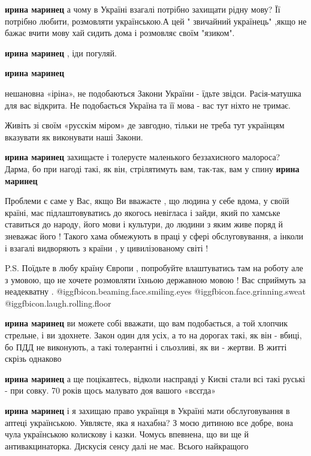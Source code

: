 \begin{itemize}
\begin{itemize}
\textbf{ирина маринец} а чому в Україні взагалі потрібно захищати рідну мову? Її потрібно любити, розмовляти українською.А цей " звичайний українець" ,якщо не бажає вчити мову хай сидить дома і розмовляє своїм "язиком".

\textbf{ирина маринец} , іди погуляй.

\textbf{ирина маринец} 

нешановна «іріна», не подобаються Закони України - їдьте звідси. Расія-матушка
для вас відкрита.  Не подобається Україна та її мова - вас тут ніхто не тримає.

Живіть зі своїм «русскім міром» де завгодно, тільки не треба тут українцям
вказувати як виконувати наші Закони.

\textbf{ирина маринец} захищаєте і толеруєте маленького беззахисного малороса? Дарма, бо при нагоді такі, як він, стрілятимуть вам, так-так, вам у спину
\textbf{ирина маринец} 

Проблеми є саме у Вас, якщо Ви вважаєте , що людина у себе вдома, у своїй
країні, має підлаштовуватись до якогось невігласа і зайди, який по хамське
ставиться до народу, його мови і культури, до людини з яким живе поряд й
зневажає його ! Такого хама обмежують в праці у сфері обслуговування, а інколи
і взагалі видворяють з країни , у цивилізованому світі !

P.S. Поїдьте в любу країну Європи , попробуйте влаштуватись там на роботу але з
умовою, що не хочете розмовляти їхньою державною мовою ! Вас сприймуть за
неадекватну . @igg{fbicon.beaming.face.smiling.eyes}  @igg{fbicon.face.grinning.sweat}  @igg{fbicon.laugh.rolling.floor} 

\textbf{ирина маринец} ви можете собі вважати, що вам подобається, а той хлопчик стрельне, і ви здохнете.
Закон один для усіх, а то на дорогах такі, як він - вбиці, бо ПДД не виконують, а такі толерантні і сльозливі, як ви - жертви.
В житті скрізь однаково

\textbf{ирина маринец} а ще поцікавтесь, відколи насправді у Києві стали всі такі руські - при совку. 70 років щось малувато доя вашого «всєгда»

\textbf{ирина маринец} і я захищаю право українця в Україні мати обслуговування в аптеці українською. Уявляєте, яка я нахабна?
З моєю дитиною все добре, вона чула українською колискову і казки.
Чомусь впевнена, що ви ще й антивакцинаторка.
Дискусія сенсу далі не має.
Всього найкращого


\end{itemize}
\end{itemize}
